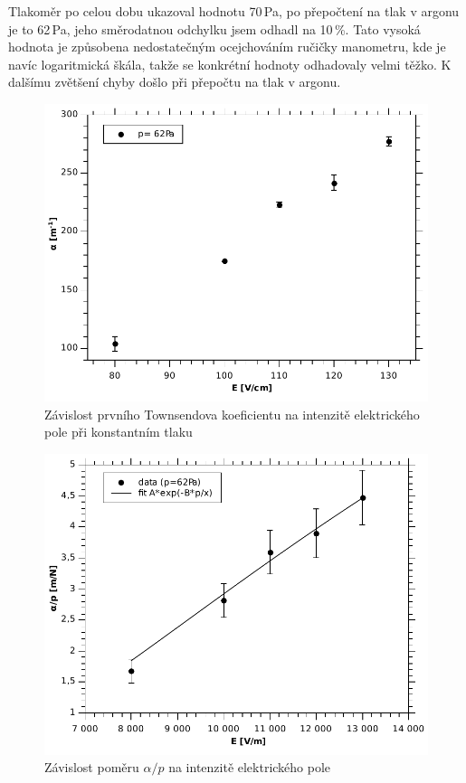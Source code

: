 \documentclass[12pt]{article}
\begin{document}
Tlakoměr po celou dobu ukazoval hodnotu 70\,Pa, po přepočtení na tlak v argonu je to 62\,Pa, jeho směrodatnou odchylku jsem odhadl na 10\,\%. Tato vysoká hodnota je způsobena nedostatečným ocejchováním ručičky manometru, kde je navíc logaritmická škála, takže se konkrétní hodnoty odhadovaly velmi těžko. K dalšímu zvětšení chyby došlo při přepočtu na tlak v argonu.

\begin{figure}[!htbp]
\begin{center}
\includegraphics[width=13cm]{Graph3.pdf}
\caption{Závislost prvního Townsendova koeficientu na intenzitě elektrického pole při konstantním tlaku}
\label{obrvysledky}
\end{center}
\end{figure}

\begin{figure}[!htbp]
\begin{center}
\includegraphics[width=13cm]{Graph2.pdf}
\caption{Závislost poměru $\alpha/p$ na intenzitě elektrického pole}
\label{AB}
\end{center}
\end{figure}
\end{document}
